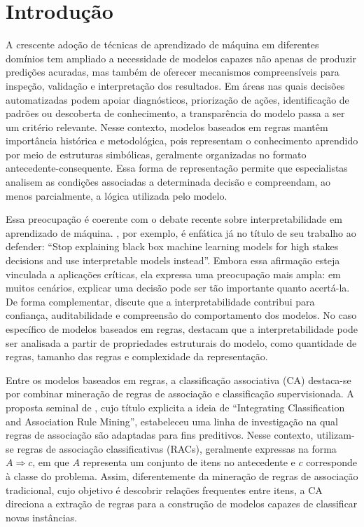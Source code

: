 \chapter{Introdução}\label{intro}

A crescente adoção de técnicas de aprendizado de máquina em diferentes domínios tem ampliado a necessidade de modelos capazes não apenas de produzir predições acuradas, mas também de oferecer mecanismos compreensíveis para inspeção, validação e interpretação dos resultados. Em áreas nas quais decisões automatizadas podem apoiar diagnósticos, priorização de ações, identificação de padrões ou descoberta de conhecimento, a transparência do modelo passa a ser um critério relevante. Nesse contexto, modelos baseados em regras mantêm importância histórica e metodológica, pois representam o conhecimento aprendido por meio de estruturas simbólicas, geralmente organizadas no formato antecedente-consequente. Essa forma de representação permite que especialistas analisem as condições associadas a determinada decisão e compreendam, ao menos parcialmente, a lógica utilizada pelo modelo.

Essa preocupação é coerente com o debate recente sobre interpretabilidade em aprendizado de máquina. , por exemplo, é enfática já no título de seu trabalho ao defender: ``Stop explaining black box machine learning models for high stakes decisions and use interpretable models instead''. Embora essa afirmação esteja vinculada a aplicações críticas, ela expressa uma preocupação mais ampla: em muitos cenários, explicar uma decisão pode ser tão importante quanto acertá-la. De forma complementar,  discute que a interpretabilidade contribui para confiança, auditabilidade e compreensão do comportamento dos modelos. No caso específico de modelos baseados em regras,  destacam que a interpretabilidade pode ser analisada a partir de propriedades estruturais do modelo, como quantidade de regras, tamanho das regras e complexidade da representação.

Entre os modelos baseados em regras, a classificação associativa (CA) destaca-se por combinar mineração de regras de associação e classificação supervisionada. A proposta seminal de , cujo título explicita a ideia de ``Integrating Classification and Association Rule Mining'', estabeleceu uma linha de investigação na qual regras de associação são adaptadas para fins preditivos. Nesse contexto, utilizam-se regras de associação classificativas (RACs), geralmente expressas na forma $A \Rightarrow c$, em que $A$ representa um conjunto de itens no antecedente e $c$ corresponde à classe do problema. Assim, diferentemente da mineração de regras de associação tradicional, cujo objetivo é descobrir relações frequentes entre itens, a CA direciona a extração de regras para a construção de modelos capazes de classificar novas instâncias.

